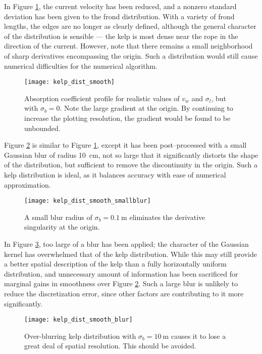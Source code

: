 In Figure \ref{fig:kelp_dist_smooth}, the current velocity has been reduced, and a nonzero standard deviation has been given to the frond distribution.
With a variety of frond lengths, the edges are no longer as clearly defined, although the general character of the distribution is sensible --- the kelp is most dense near the rope in the direction of the current.
However, note that there remains a small neighborhood of sharp derivatives encompassing the origin.
Such a distribution would still cause numerical difficulties for the numerical algorithm.

\begin{figure}[H]
  \centering
  \vspace{-3em}
  \texttt{[image: kelp\_dist\_smooth]}
  \caption{Absorption coefficient profile for realistic values of $v_w$ and $\sigma_l$, but with $\sigma_b=0$. Note the large gradient at the origin. By continuing to increase the plotting resolution, the gradient would be found to be unbounded.}
  \label{fig:kelp_dist_smooth}
\end{figure}

Figure \ref{fig:kelp_dist_smooth_smallblur} is similar to Figure \ref{fig:kelp_dist_smooth}, except it has been post--processed with a small Gaussian blur of radius \SI{10}{cm}, not so large that it significantly distorts the shape of the distribution, but sufficient to remove the discontinuity in the origin.
Such a kelp distribution is ideal, as it balances accuracy with ease of numerical approximation.
\begin{figure}[H]
  \centering
  \vspace{-3em}
  \texttt{[image: kelp\_dist\_smooth\_smallblur]}
  \caption{A small blur radius of $\sigma_b=\SI{0.1}{\m}$ eliminates the derivative singularity at the origin.}
  \label{fig:kelp_dist_smooth_smallblur}
\end{figure}

In Figure \ref{fig:kelp_dist_smooth_blur}, too large of a blur has been applied; the character of the Gaussian kernel has overwhelmed that of the kelp distribution.
While this may still provide a better spatial description of the kelp than a fully horizontally uniform distribution, and unnecessary amount of information has been sacrificed for marginal gains in smoothness over Figure \ref{fig:kelp_dist_smooth_smallblur}.
Such a large blur is unlikely to reduce the discretization error, since other factors are contributing to it more significantly.
\begin{figure}[H]
  \centering
  \vspace{-3em}
  \texttt{[image: kelp\_dist\_smooth\_blur]}
  \caption{Over-blurring kelp distribution with $\sigma_b=\SI{10}{\m}$ causes it to lose a great deal of spatial resolution. This should be avoided.}
  \label{fig:kelp_dist_smooth_blur}
\end{figure}
